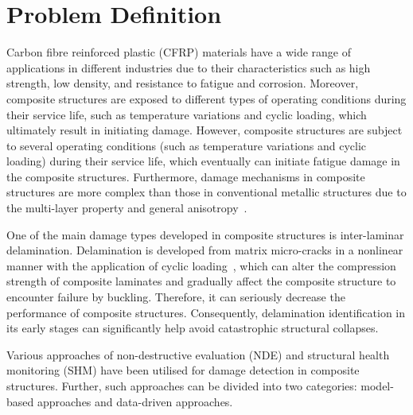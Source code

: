 \section{Problem Definition}
\label{sec11}
Carbon fibre reinforced plastic (CFRP) materials have a wide range of applications in different industries due to their characteristics such as high strength, low density, and resistance to fatigue and corrosion.
Moreover, composite structures are exposed to different types of operating conditions during their service life, such as temperature variations and cyclic loading, which ultimately result in initiating damage.
However, composite structures are subject to several operating conditions (such as temperature variations and cyclic loading) during their service life, which eventually can initiate fatigue damage in the composite structures.
Furthermore, damage mechanisms in composite structures are more complex than those in conventional metallic structures due to the multi-layer property and general anisotropy~\cite{Wu2021}. 

One of the main damage types developed in composite structures is inter-laminar delamination.
Delamination is developed from matrix micro-cracks in a nonlinear manner with the application of cyclic loading~\cite{Reifsnider1983, Wu2021}, which can alter the compression strength of composite laminates and gradually affect the composite structure to encounter failure by buckling. Therefore, it can seriously decrease the performance of composite structures.
Consequently, delamination identification in its early stages can significantly help avoid catastrophic structural collapses.

Various approaches of non-destructive evaluation (NDE) and structural health monitoring (SHM) have been utilised for damage detection in composite structures.
Further, such approaches can be divided into two categories: model-based approaches and data-driven approaches.

